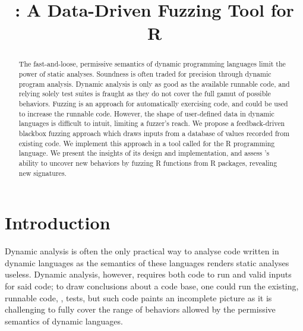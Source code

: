 \documentclass[sigplan,nonacm,anonymous,review]{acmart}
\begin{document}
\title{\tool: A Data-Driven Fuzzing Tool for R}

\begin{abstract}
The fast-and-loose, permissive semantics of dynamic programming
languages limit the power of static analyses. Soundness is often
traded for precision through dynamic program analysis.  Dynamic
analysis is only as good as the available runnable code, and relying
solely test suites is fraught as they do not cover the full gamut of
possible behaviors. Fuzzing is an approach for automatically
exercising code, and could be used to increase the runnable code.
However, the shape of user-defined data in dynamic languages is
difficult to intuit, limiting a fuzzer's reach.  We propose a
feedback-driven blackbox fuzzing approach which draws inputs from a
database of values recorded from existing code.  We implement this
approach in a tool called \tool for the R programming language.  We
present the insights of its design and implementation, and assess
\tool's ability to uncover new behaviors by fuzzing \UFNumFunctions R
functions from \UFNumPackages R packages, revealing
\UFSignatrSignatures new signatures.
\end{abstract}

\maketitle

\section{Introduction}\label{sec:introduction}

Dynamic analysis is often the only practical way to analyse code
written in dynamic languages as the semantics of these languages
renders static analyses useless.  Dynamic analysis, however, requires
both code to run and valid inputs for said code; to draw conclusions
about a code base, one could run the existing, runnable code, \Eg,
tests, but such code paints an incomplete picture as it is challenging
to fully cover the range of behaviors allowed by the permissive
semantics of dynamic languages.
\end{document}
